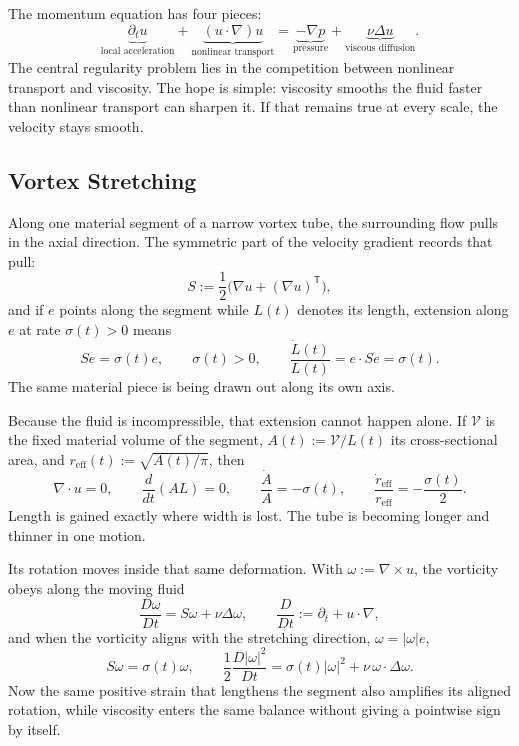 
The momentum equation has four pieces:
\[
  \underbrace{\partial_t u}_{\text{local acceleration}}
  +
  \underbrace{(u\cdot\nabla)u}_{\text{nonlinear transport}}
  =
  \underbrace{-\nabla p}_{\text{pressure}}
  +
  \underbrace{\nu\Delta u}_{\text{viscous diffusion}}.
\]
The central regularity problem lies in the competition between nonlinear transport and viscosity.
The hope is simple: viscosity smooths the fluid faster than nonlinear transport can sharpen it.
If that remains true at every scale, the velocity stays smooth.

\subsection{Vortex Stretching}\label{sub:ThePerfectlyStretchingVortex}

Along one material segment of a narrow vortex tube, the surrounding flow pulls in the axial direction. The symmetric part of the velocity gradient records that pull:
\[
  S:=\frac12\bigl(\nabla u+(\nabla u)^{\mathsf T}\bigr),
\]
and if \(e\) points along the segment while \(L(t)\) denotes its length, extension along \(e\) at rate \(\sigma(t)>0\) means
\[
  Se=\sigma(t)e,
  \qquad
  \sigma(t)>0,
  \qquad
  \frac{\dot L(t)}{L(t)}
  =
  e\cdot Se
  =
  \sigma(t).
\]
The same material piece is being drawn out along its own axis.

Because the fluid is incompressible, that extension cannot happen alone. If \(\mathcal V\) is the fixed material volume of the segment, \(A(t):=\mathcal V/L(t)\) its cross-sectional area, and \(r_{\mathrm{eff}}(t):=\sqrt{A(t)/\pi}\), then
\[
  \nabla\cdot u=0,
  \qquad
  \frac{d}{dt}(A L)=0,
  \qquad
  \frac{\dot A}{A}=-\sigma(t),
  \qquad
  \frac{\dot r_{\mathrm{eff}}}{r_{\mathrm{eff}}}
  =
  -\frac{\sigma(t)}{2}.
\]
Length is gained exactly where width is lost. The tube is becoming longer and thinner in one motion.

Its rotation moves inside that same deformation. With \(\omega:=\nabla\times u\), the vorticity obeys along the moving fluid
\[
  \frac{D\omega}{Dt}
  =
  S\omega+\nu\Delta\omega,
  \qquad
  \frac{D}{Dt}
  :=
  \partial_t+u\cdot\nabla,
\]
and when the vorticity aligns with the stretching direction, \(\omega=|\omega|e\),
\[
  S\omega
  =
  \sigma(t)\omega,
  \qquad
  \frac12\frac{D|\omega|^2}{Dt}
  =
  \sigma(t)|\omega|^2
  +
  \nu\,\omega\cdot\Delta\omega.
\]
Now the same positive strain that lengthens the segment also amplifies its aligned rotation, while viscosity enters the same balance without giving a pointwise sign by itself.

